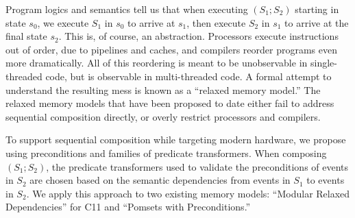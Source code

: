 
Program logics and semantics tell us that when executing $(S_1; S_2)$ starting in state $s_0$,
we execute $S_1$ in $s_0$ to arrive at $s_1$, then execute $S_2$ in $s_1$ to
arrive at the final state $s_2$.  This is, of course, an abstraction.  Processors
execute instructions out of order, due to pipelines and caches, and compilers
reorder programs even more dramatically.  All of this reordering is meant to
be unobservable in single-threaded code, but is observable in multi-threaded code.
A formal attempt to understand the resulting mess is known
as a ``relaxed memory model.''  The relaxed memory models that have been
proposed to date either fail to address sequential composition directly, or overly
restrict processors and compilers.

To support sequential composition while targeting modern hardware, we propose
using preconditions and families of predicate transformers.  When composing
$(S_1;S_2)$, the predicate transformers used to validate the preconditions of
events in $S_2$ are chosen based on the semantic dependencies from events in
$S_1$ to events in $S_2$.  We apply this approach to two existing memory
models: ``Modular Relaxed Dependencies'' for C11 and ``Pomsets with
Preconditions.''


\endinput
